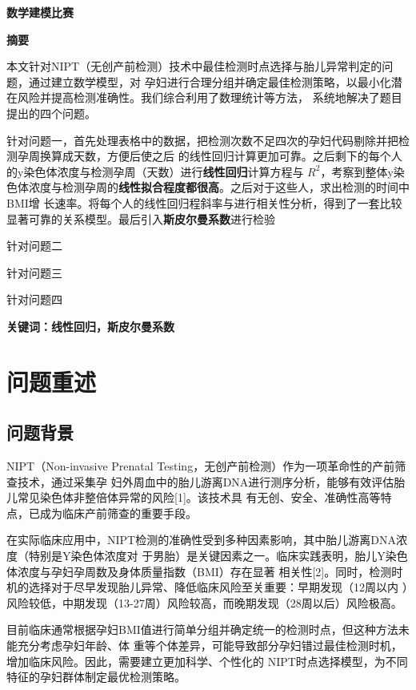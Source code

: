 \documentclass{article}
\date{}
\begin{document}
\vspace{-30pt}
\begin{center}
    \Large \textbf{数学建模比赛}  %
\end{center}
\vspace{-13pt}
\begin{center}
    \large \textbf{摘要}  %
\end{center}
\qquad 本文针对NIPT（无创产前检测）技术中最佳检测时点选择与胎儿异常判定的问题，通过建立数学模型，对
孕妇进行合理分组并确定最佳检测策略，以最小化潜在风险并提高检测准确性。我们综合利用了数理统计等方法，
系统地解决了题目提出的四个问题。

针对问题一，首先处理表格中的数据，把检测次数不足四次的孕妇代码剔除并把检测孕周换算成天数，方便后使之后
的线性回归计算更加可靠。之后剩下的每个人的y染色体浓度与检测孕周（天数）进行\textbf{线性回归}计算方程与
$R^2$，考察到整体y染色体浓度与检测孕周的\textbf{线性拟合程度都很高}。之后对于这些人，求出检测的时间中BMI增
长速率。将每个人的线性回归程斜率与进行相关性分析，得到了一套比较显著可靠的关系模型。最后引入\textbf{斯皮尔曼系数}进行检验

针对问题二

针对问题三

针对问题四

\textbf{关键词：线性回归，斯皮尔曼系数}
\newpage
\section{\textbf{问题重述}}
\subsection{\textbf{问题背景}}
NIPT（Non-invasive Prenatal Testing，无创产前检测）作为一项革命性的产前筛查技术，通过采集孕
妇外周血中的胎儿游离DNA进行测序分析，能够有效评估胎儿常见染色体非整倍体异常的风险[1]。该技术具
有无创、安全、准确性高等特点，已成为临床产前筛查的重要手段。

在实际临床应用中，NIPT检测的准确性受到多种因素影响，其中胎儿游离DNA浓度（特别是Y染色体浓度对
于男胎）是关键因素之一。临床实践表明，胎儿Y染色体浓度与孕妇孕周数及身体质量指数（BMI）存在显著
相关性[2]。同时，检测时机的选择对于尽早发现胎儿异常、降低临床风险至关重要：早期发现（12周以内
）风险较低，中期发现（13-27周）风险较高，而晚期发现（28周以后）风险极高。

目前临床通常根据孕妇BMI值进行简单分组并确定统一的检测时点，但这种方法未能充分考虑孕妇年龄、体
重等个体差异，可能导致部分孕妇错过最佳检测时机，增加临床风险。因此，需要建立更加科学、个性化的
NIPT时点选择模型，为不同特征的孕妇群体制定最优检测策略。
\end{document}
